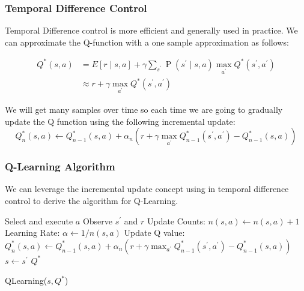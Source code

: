 \documentclass[12pt]{article}
\begin{document}
        \subsubsection{Temporal Difference Control}
            Temporal Difference control is more efficient and generally used in practice. We can approximate the
            Q-function with a one sample approximation as follows:

            \begin{align*}
            Q^{*}(s, a) &=E[r \mid s, a]+\gamma \sum_{s^{\prime}} \operatorname{P}\left(s^{\prime} \mid s, a\right) \max _{a^{\prime}} Q^{*}\left(s^{\prime}, a^{\prime}\right) \\
            & \approx r+\gamma \max _{a^{\prime}} Q^{*}\left(s^{\prime}, a^{\prime}\right)
            \end{align*}
            
            We will get many samples over time so each time we are going to gradually update the Q function using the
            following incremental update:
            $$ Q_{n}^{*}(s, a) \leftarrow Q_{n-1}^{*}(s, a)+\alpha_{n}\left(r+\gamma \max _{a^{\prime}} Q_{n-1}^{*}\left(s^{\prime}, a^{\prime}\right)-Q_{n-1}^{*}(s, a)\right)$$
        
        \subsubsection{Q-Learning Algorithm}
            We can leverage the incremental update concept using in temporal difference control to derive the algorithm
            for Q-Learning.
            
            \begin{algorithm}[H] \label{QLearning}
                \SetAlgoLined
                 {
                    Select and execute $a$ \;
                    Observe $s^{\prime}$ and $r$\;
                    Update Counts: $n(s, a) \gets n(s, a) + 1$ \;
                    Learning Rate: $\alpha \gets 1/n(s,a)$ \;
                    Update Q value: $Q_{n}^{*}(s, a) \leftarrow Q_{n-1}^{*}(s, a)+\alpha_{n}\left(r+\gamma \max
                    _{a^{\prime}} Q_{n-1}^{*}\left(s^{\prime}, a^{\prime}\right)-Q_{n-1}^{*}(s, a)\right)$ \;
                    $s \gets s^{\prime}$ \;
                }
                \Return $Q^*$
                \caption{QLearning($s, Q^*$)}
            \end{algorithm}
\end{document}
